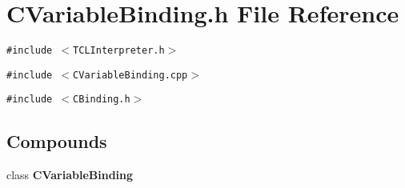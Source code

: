 \section{CVariable\-Binding.h File Reference}
\label{CVariableBinding_8h}
{\tt \#include $<$TCLInterpreter.h$>$}\par
{\tt \#include $<$CVariable\-Binding.cpp$>$}\par
{\tt \#include $<$CBinding.h$>$}\par
\subsection*{Compounds}
\begin{CompactItemize}
\item 
class {\bf CVariable\-Binding}
\end{CompactItemize}
